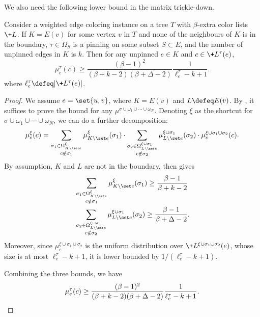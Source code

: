 \documentclass[a4paper,11pt]{article}
\begin{document}
We also need the following lower bound in the matrix trickle-down.
\begin{lemma}\label{lem:marginal-lower-weighted}
    Consider a weighted edge coloring instance on a tree $T$ with $\beta$-extra
    color lists $\+L$.
    If $K=E(v)$ for some vertex $v$ in $T$ and none of the neighbours of $K$ is in the boundary,
    $\tau\in \Omega_S$ is a pinning on some subset $S \subset E$, and the number of 
    unpinned edges in $K$ is $k$. Then for any unpinned $e\in K$ and $c\in \+L^\tau(e)$,
    \[
    \mu^{\tau}_e(c) \ge \frac{(\beta-1)^2}{(\beta+k-2)(\beta+\Delta-2)}\frac{1}{\ell_e^\tau-k+1}.
    \]
    where $\ell^\tau_e\defeq|\+L^\tau(e)|$.
\end{lemma}
\begin{proof}
    We assume $e = \set{u, v}$, where $K=E(v)$ and $L\defeq E(v)$.
    By ,
    it suffices to prove the bound for any $\mu^{\sigma\cup\omega_1\cup\cdots\cup\omega_N}$.
    Denoting $\xi$ as the shortcut for $\sigma\cup\omega_1\cup\cdots\cup\omega_N$,
    we can do a further decomposition:
    \begin{align*}
        \mu^{\xi}_e(c) =
        \sum_{\substack{\sigma_1\in\Omega^{\xi            }_{K\setminus\set e}\\ c\notin \sigma_1}}
        \mu^{\xi                        }_{K\setminus\set e}(\sigma_1)\cdot
        \sum_{\substack{\sigma_2\in\Omega^{\xi\cup\sigma_1}_{L\setminus\set e}\\ c\notin \sigma_2}}
        \mu^{\xi\cup\sigma_1            }_{L\setminus\set e}(\sigma_2)\cdot
        \mu^{\xi\cup\sigma_1\cup\sigma_2}_e(c).
    \end{align*}
    By assumption, $K$ and $L$ are not in the boundary, then 
    gives\begin{align*}
       &\sum_{\substack{\sigma_1\in\Omega^{\xi            }_{K\setminus\set e}\\ c\notin \sigma_1}}
        \mu^{\xi                        }_{K\setminus\set e}(\sigma_1)
        \ge \frac{\beta-1}{\beta + k - 2}
     \\&\sum_{\substack{\sigma_2\in\Omega^{\xi\cup\sigma_1}_{L\setminus\set e}\\ c\notin \sigma_2}}
        \mu^{\xi\cup\sigma_1            }_{L\setminus\set e}(\sigma_2)
        \ge \frac{\beta-1}{\beta + \Delta - 2}.
    \end{align*}
    Moreover, since $\mu^{\xi\cup\sigma_1\cup\sigma_2}_e$ is the uniform distribution
    over $\+L^{\xi\cup\sigma_1\cup\sigma_2}(e)$, whose size is at most $\ell_e^{\tau}-k+1$, it is
    lower bounded by $1/(\ell_e^{\tau}-k+1)$.

    Combining the three bounds, we have
\[
        \mu^{\tau}_e(c) \ge \frac{(\beta-1)^2}{(\beta+k-2)(\beta+\Delta-2)}\frac{1}{\ell_e^\tau-k+1}.
        \qedhere
    \]
\end{proof}
\end{document}
